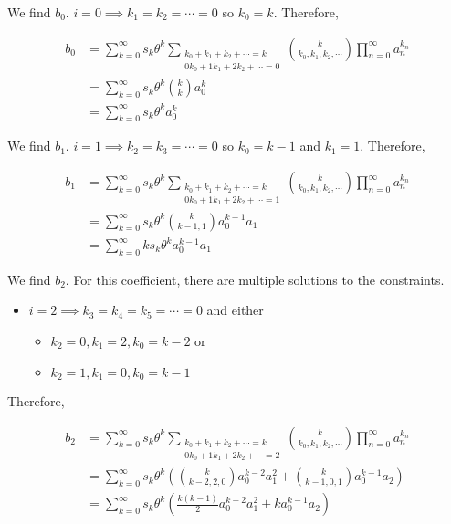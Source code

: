 We find $b_0$. $i = 0 \implies k_1 = k_2 = \cdots = 0$ so $k_0 = k$. Therefore,

\begin{align*}
    b_0 
    &= \sum_{k=0}^{\infty} s_k \theta^k \sum_{\substack{k_0 + k_1 + k_2 + \cdots = k \\ 0 k_0 + 1 k_1 + 2 k_2 + \cdots = 0}} \binom{k}{k_0, k_1, k_2, \cdots} \prod_{n=0}^{\infty} a_n^{k_n} \\
    &= \sum_{k=0}^{\infty} s_k \theta^k \binom{k}{k} a_0^{k} \\
    &= \sum_{k=0}^{\infty} s_k \theta^k a_0^k
\end{align*}

We find $b_1$. $i = 1 \implies k_2 = k_3 = \cdots = 0$ so $k_0 = k - 1$ and $k_1 = 1$. Therefore,

\begin{align*}
    b_1
    &= \sum_{k=0}^{\infty} s_k \theta^k \sum_{\substack{k_0 + k_1 + k_2 + \cdots = k \\ 0 k_0 + 1 k_1 + 2 k_2 + \cdots = 1}} \binom{k}{k_0, k_1, k_2, \cdots} \prod_{n=0}^{\infty} a_n^{k_n} \\
    &= \sum_{k=0}^{\infty} s_k \theta^k \binom{k}{k - 1, 1} a_0^{k - 1} a_1 \\
    &= \sum_{k=0}^{\infty} k s_k \theta^k a_0^{k-1} a_1
\end{align*}

We find $b_2$. For this coefficient, there are multiple solutions to the constraints. 

\begin{itemize}
    \item $i = 2 \implies k_3 = k_4 = k_5 = \cdots = 0$ and either
    \begin{itemize}
        \item $k_2 = 0, k_1 = 2, k_0 = k - 2$ or
        \item $k_2 = 1, k_1 = 0, k_0 = k - 1$
    \end{itemize}
\end{itemize}

Therefore,

\begin{align*}
    b_2
    &= \sum_{k=0}^{\infty} s_k \theta^k \sum_{\substack{k_0 + k_1 + k_2 + \cdots = k \\ 0 k_0 + 1 k_1 + 2 k_2 + \cdots = 2}} \binom{k}{k_0, k_1, k_2, \cdots} \prod_{n=0}^{\infty} a_n^{k_n} \\
    &= \sum_{k=0}^{\infty} s_k \theta^k \left(\binom{k}{k - 2, 2, 0}a_0^{k-2} a_1^{2} + \binom{k}{k - 1, 0, 1}a_0^{k-1} a_2\right) \\
    &= \sum_{k=0}^{\infty} s_k \theta^k \left(\frac{k(k-1)}{2} a_0^{k-2}a_1^{2} + k a_0^{k-1}a_2\right)
\end{align*}
